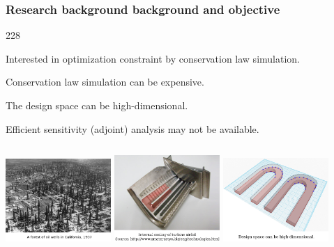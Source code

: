 \documentclass{beamer}
\newcommand{\barrow}{\item[\color{darkred}\ding{228}]}
\begin{document}
\begin{frame}
    \frametitle{Research background \hfill \scriptsize{background and objective}}\small
    \begin{dinglist}{228}
        \barrow Interested in optimization constraint by conservation law simulation.
        \barrow Conservation law simulation can be expensive.
        \barrow The design space can be high-dimensional.
        \barrow Efficient sensitivity (adjoint) analysis may not be available.
    \end{dinglist}
    \begin{columns}
        \centering
            \includegraphics[width=4cm]{oil_field.png}
        \centering
            \includegraphics[width=4cm]{ubend.png}
        \centering
            \includegraphics[width=4cm]{ubend_cad.png}
    \end{columns}
\end{frame}
\end{document}
